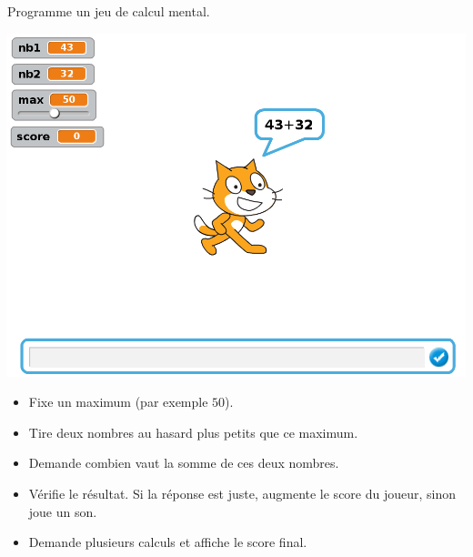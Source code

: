 \documentclass[class=report,crop=false, 12pt]{standalone}
\begin{document}
\begin{activite}

Programme un jeu de calcul mental.

\begin{center}
  \includegraphics[scale=\scaleecran]{ecran-07-ex3} 
\end{center}

\begin{itemize}
  \item Fixe un maximum (par exemple $50$).
  \item Tire deux nombres au hasard plus petits que ce maximum.
  \item Demande combien vaut la somme de ces deux nombres.
  \item Vérifie le résultat. Si la réponse est juste, augmente le score du joueur, sinon joue un son.
  \item Demande plusieurs calculs et affiche le score final.
\end{itemize}

\end{activite}
\end{document}
